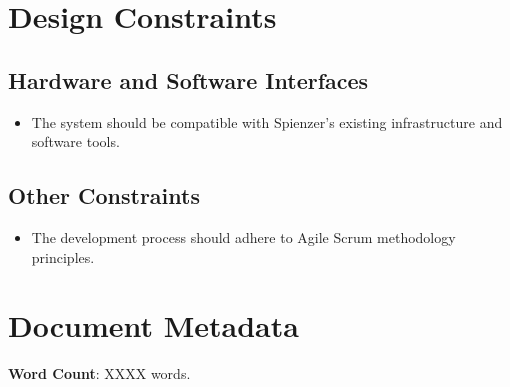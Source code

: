 \documentclass[12pt]{article}
\begin{document}
\section{Design Constraints}

\subsection{Hardware and Software Interfaces}
\begin{itemize}
    \item The system should be compatible with Spienzer's existing infrastructure and software tools.
\end{itemize}

\subsection{Other Constraints}
\begin{itemize}
    \item The development process should adhere to Agile Scrum methodology principles.
\end{itemize}

\newpage %
\section*{Document Metadata}
\textbf{Word Count}: XXXX words.
\end{document}
